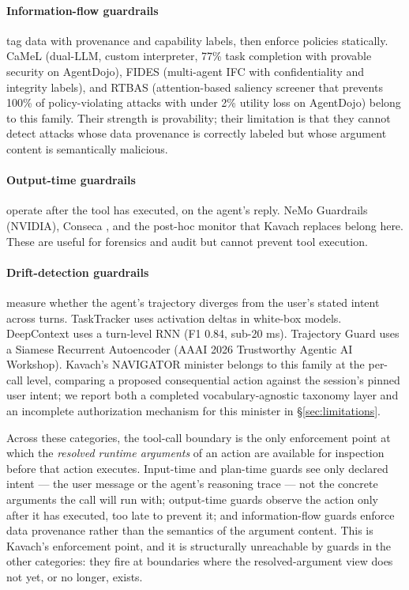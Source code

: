 \documentclass[sigconf,anonymous,review]{acmart}
\begin{document}
\paragraph{Information-flow guardrails} tag data with provenance and capability
labels, then enforce policies statically. CaMeL \cite{debenedetti2025camel}
(dual-LLM, custom interpreter, 77\% task completion with provable security on
AgentDojo), FIDES \cite{costa2025fides} (multi-agent IFC with confidentiality and
integrity labels), and RTBAS \cite{zhong2025rtbas} (attention-based saliency
screener that prevents 100\% of policy-violating attacks with under 2\% utility
loss on AgentDojo) belong to this family. Their strength is provability; their limitation is that they cannot
detect attacks whose data provenance is correctly labeled but whose argument
content is semantically malicious.

\paragraph{Output-time guardrails} operate after the tool has executed, on the
agent's reply. NeMo Guardrails (NVIDIA), Conseca \cite{tsai2025conseca}, and
the post-hoc monitor that Kavach replaces belong here. These are useful for
forensics and audit but cannot prevent tool execution.

\paragraph{Drift-detection guardrails} measure whether the agent's trajectory
diverges from the user's stated intent across turns. TaskTracker
\cite{abdelnabi2024tasktracker} uses activation deltas in white-box models.
DeepContext \cite{albrethsen2026deepcontext} uses a turn-level RNN (F1 0.84,
sub-20 ms). Trajectory Guard \cite{advani2026trajectoryguard} uses a Siamese
Recurrent Autoencoder (AAAI 2026 Trustworthy Agentic AI Workshop). Kavach's
NAVIGATOR minister belongs to this family at the per-call level, comparing a
proposed consequential action against the session's pinned user intent; we
report both a completed vocabulary-agnostic taxonomy layer and an incomplete
authorization mechanism for this minister in \S\ref{sec:limitations}.

Across these categories, the tool-call boundary is the only enforcement point at
which the \emph{resolved runtime arguments} of an action are available for
inspection before that action executes. Input-time and plan-time guards see only
declared intent --- the user message or the agent's reasoning trace --- not the
concrete arguments the call will run with; output-time guards observe the action
only after it has executed, too late to prevent it; and information-flow guards
enforce data provenance rather than the semantics of the argument content. This
is Kavach's enforcement point, and it is structurally unreachable by guards in
the other categories: they fire at boundaries where the resolved-argument view
does not yet, or no longer, exists.
\end{document}
